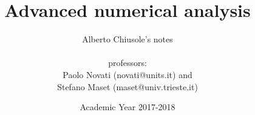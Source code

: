 \documentclass[a4paper,12pt]{book}
\begin{document}
	
	\title{Advanced numerical analysis}
	\author{Alberto Chiusole's notes\\\\
		professors:\\
		Paolo Novati (novati@units.it) and\\
		Stefano Maset (maset@univ.trieste.it)}
	\date{Academic Year 2017-2018}
	
	\frontmatter
	\maketitle
	\tableofcontents
	
	\mainmatter
	
	
	
	
	
	\backmatter
	
\end{document}

